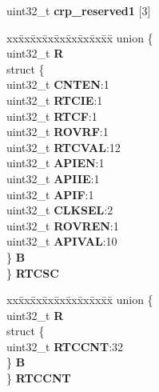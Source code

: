 \begin{DoxyCompactItemize}
\begin{tabbing}
\end{tabbing}\item 
\mbox{\label{structCRP__tag_a7c847a54348d8939c17e649f97fc20ba}} 
uint32\+\_\+t {\bfseries crp\+\_\+reserved1} \mbox{[}3\mbox{]}
\item 
\mbox{\label{structCRP__tag_a1dfb7fcb93362a0e1cf5024311876b3a}} 
\begin{tabbing}
xx\=xx\=xx\=xx\=xx\=xx\=xx\=xx\=xx\=\kill
union \{\\
\>uint32\_t {\bfseries R}\\
\>struct \{\\
\>\>uint32\_t {\bfseries CNTEN}:1\\
\>\>uint32\_t {\bfseries RTCIE}:1\\
\>\>uint32\_t {\bfseries RTCF}:1\\
\>\>uint32\_t {\bfseries ROVRF}:1\\
\>\>uint32\_t {\bfseries RTCVAL}:12\\
\>\>uint32\_t {\bfseries APIEN}:1\\
\>\>uint32\_t {\bfseries APIIE}:1\\
\>\>uint32\_t {\bfseries APIF}:1\\
\>\>uint32\_t {\bfseries CLKSEL}:2\\
\>\>uint32\_t {\bfseries ROVREN}:1\\
\>\>uint32\_t {\bfseries APIVAL}:10\\
\>\} {\bfseries B}\\
\} {\bfseries RTCSC}\\

\end{tabbing}\item 
\mbox{\label{structCRP__tag_a1d15a3cc6b76972ca22ae0cfc1298781}} 
\begin{tabbing}
xx\=xx\=xx\=xx\=xx\=xx\=xx\=xx\=xx\=\kill
union \{\\
\>uint32\_t {\bfseries R}\\
\>struct \{\\
\>\>uint32\_t {\bfseries RTCCNT}:32\\
\>\} {\bfseries B}\\
\} {\bfseries RTCCNT}\\


\end{tabbing}
\end{DoxyCompactItemize}
